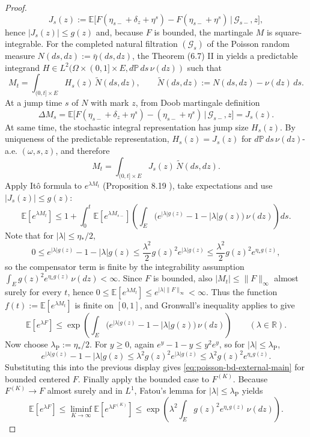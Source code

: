 \documentclass{article}
\newcommand{\E}{\mathbb{E}}
\begin{document}
\begin{proof}
\[
J_s(z):=
\mathbb E\Big[F(\eta_{s-}+\delta_z+\eta^s)-F(\eta_{s-}+\eta^s)\,\Big|\,\mathcal G_{s-},z\Big],
\]
hence $|J_s(z)|\le g(z)$ and, because $F$ is bounded, the martingale $M$ is square-integrable. For the completed natural filtration $(\mathcal G_s)$ of the Poisson random measure $N(ds,dz):=\bar\eta(ds,dz)$, the Theorem (6.7) II in \cite{ikeda2014stochastic} yields a predictable integrand $H\in L^2(\Omega\times(0,1]\times E, d\mathbb P\,ds\,\nu(dz))$ such that
\[
M_t=\int_{(0,t]\times E} H_s(z)\,\widetilde N(ds,dz),
\qquad
\widetilde N(ds,dz):=N(ds,dz)-\nu(dz)\,ds.
\]
At a jump time $s$ of $N$ with mark $z$, from Doob martingale definition
\[
\Delta M_s=\mathbb E\Big[F(\eta_{s-}+\delta_z+\eta^s)-(\eta_{s-}+\eta^s)\,\Big|\,\mathcal G_{s-},z\Big]=J_s(z).
\]
At same time, the stochastic integral representation has jump size $H_s(z)$. By uniqueness of the predictable representation, $H_s(z)=J_s(z)$ for $d\mathbb P\,ds\,\nu(dz)$-a.e. $(\omega,s,z)$, and therefore
\[
M_t=\int_{(0,t]\times E} J_s(z)\,\widetilde N(ds,dz).
\]
Apply It\^o formula to $e^{\lambda M_t}$ (Proposition 8.19 \cite{cont2003financial}), take expectations and use $|J_s(z)|\le g(z)$: 
\[
\E[e^{\lambda M_t}]
\le
1+\int_0^t \E[e^{\lambda M_{s-}}]
\left(\int_E \bigl(e^{|\lambda|g(z)}-1-|\lambda|g(z)\bigr)\,\nu(dz)\right) ds.
\]
Note that for $|\lambda|\le \eta_*/2$,
\[
0\le e^{|\lambda|g(z)}-1-|\lambda|g(z)
\le \frac{\lambda^2}{2} g(z)^2 e^{|\lambda|g(z)}
\le \frac{\lambda^2}{2} g(z)^2 e^{\eta_* g(z)},
\]
so the compensator term is finite by the integrability assumption $\int_E g(z)^2 e^{\eta_* g(z)}\,\nu(dz)<\infty$. Since $F$ is bounded, also $|M_t|\le \|F\|_\infty$ almost surely for every $t$, hence $0\le \E[e^{\lambda M_t}]\le e^{|\lambda|\|F\|_\infty}<\infty$. Thus the function $f(t):=\E[e^{\lambda M_t}]$ is finite on $[0,1]$, and Gronwall's inequality applies to give
\[
\mathbb E[e^{\lambda F}]
\le
\exp\!\left(\int_E \bigl(e^{|\lambda|g(z)}-1-|\lambda|g(z)\bigr)\,\nu(dz)\right)
\qquad (\lambda\in\mathbb R).
\]
Now choose $\lambda_\mathrm{P}:=\eta_*/2$. For $y\ge 0$, again $e^y-1-y\le y^2 e^y$, so for $|\lambda|\le \lambda_\mathrm{P}$,
\[
e^{|\lambda|g(z)}-1-|\lambda|g(z)
\le \lambda^2 g(z)^2 e^{|\lambda|g(z)}
\le \lambda^2 g(z)^2 e^{\eta_* g(z)}.
\]
Substituting this into the previous display gives \eqref{eq:poisson-bd-external-main} for bounded centered $F$. Finally apply the bounded case to $F^{(K)}$. Because $F^{(K)}\to F$ almost surely and in $L^1$, Fatou's lemma for $|\lambda|\le \lambda_\mathrm{P}$ yields
\[
\E[e^{\lambda F}]
\le
\liminf_{K\to\infty}\E[e^{\lambda F^{(K)}}]
\le
\exp\!\left(\lambda^2 \int_E g(z)^2 e^{\eta_* g(z)}\,\nu(dz)\right).
\]
\end{proof}
\end{document}
